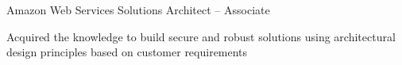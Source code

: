 

\begin{cventries}

 \cventry
    {Amazon Web Services} %
    {Solutions Architect – Associate} %
    {} %
    {} %
    {
      \begin{cvitems} %
        \item {Acquired the knowledge to build secure and robust solutions using architectural design principles based on customer requirements}
      \end{cvitems}
    }


\end{cventries}